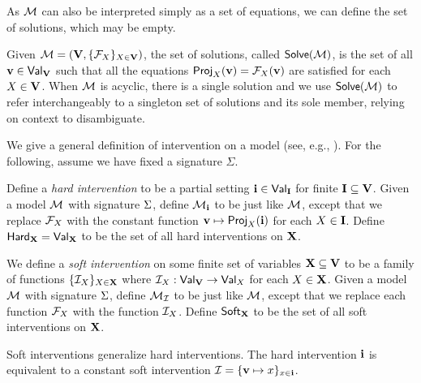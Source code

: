 \documentclass[twoside,11pt]{article}
\begin{document}
As $\mathcal{M}$ can also be interpreted simply as a set of equations, we can define the set of solutions, which may be empty.
\begin{definition}\label{def:solutionsets}
Given $\mathcal{M} = (\mathbf{V},\{\mathcal{F}_{X}\}_{X \in \mathbf{V}})$, the set of solutions, called $\mathsf{Solve}(\mathcal{M})$, is the set of all $\mathbf{v} \in \mathsf{Val}_{\mathbf{V}}$ such that all the equations $\mathsf{Proj}_{X}(\mathbf{v})= \mathcal{F}_{X}(\mathbf{v})$ are satisfied for each $X \in \mathbf{V}$. When $\mathcal{M}$ is acyclic, there is a single solution and we use $\mathsf{Solve}(\mathcal{M})$ to refer interchangeably to a singleton set of solutions and its sole member, relying on context to disambiguate.
\end{definition}

We give a general definition of intervention on a model (see, e.g., \citealt{Spirtes,Woodward2003,Pearl2009}). For the following, assume we have fixed a signature $\Sigma$.

\begin{definition}[Intervention] \label{def:intervention} Define a \textit{hard intervention} to be a partial setting $\mathbf{i} \in  \mathsf{Val}_{\mathbf{I}}$ for finite $\mathbf{I} \subseteq \mathbf{V}$. %
Given a model $\mathcal{M}$ with signature $\Sigma$, define $\mathcal{M}_{\mathbf{i}}$ to be just like $\mathcal{M}$, except that we replace $\mathcal{F}_{X}$ with the constant function $\mathbf{v} \mapsto \mathsf{Proj}_{X}(\mathbf{i})$ for each $X \in \mathbf{I}$. 
Define $\mathsf{Hard}_{\mathbf{X}} = \mathsf{Val}_{\mathbf{X}}$ to be the set of all hard interventions on $\mathbf{X}$. 
\end{definition}

\begin{definition} \label{def:softintervention}  We define a \textit{soft intervention} on some finite set of variables $\mathbf{X} \subseteq \mathbf{V}$ to be a family of functions $\{\mathcal{I}_{X}\}_{X \in \mathbf{X}}$ where $\mathcal{I}_{X}:\mathsf{Val}_{\mathbf{V}} \to \mathsf{Val}_{X}$ for each $X \in \mathbf{X}$. %
Given a model $\mathcal{M}$ with signature $\Sigma$, define $\mathcal{M}_{\mathcal{I}}$ to be just like $\mathcal{M}$, except that we replace each function $\mathcal{F}_{X}$ with the function $\mathcal{I}_{X}$. Define $\mathsf{Soft}_{\mathbf{X}}$ to be the set of all soft interventions on $\mathbf{X}$.
\end{definition}
Soft interventions generalize hard interventions. The hard intervention $\mathbf{i}$ is equivalent to a constant soft intervention $\mathcal{I} = \{\mathbf{v} \mapsto x\}_{x \in \mathbf{i}}$.
\end{document}
